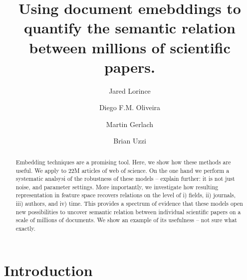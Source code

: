 \documentclass[aps,pre,twocolumn,superscriptaddress]{revtex4-1}
\begin{document}
\title{Using document emebddings to quantify the semantic relation between millions of scientific papers. }



\author{Jared Lorince} 

\author{Diego F.M. Oliveira} 

\author{Martin Gerlach} 

\author{Brian Uzzi}

\begin{abstract}
%
Embedding techniques are a promising tool.
Here, we show how these methods are useful.
We apply to 22M articles of web of science.
On the one hand we perform a systematic analsysi of the robustness of these models -- explain further: it is not just noise, and parameter settings.
More importantly, we investigate how resulting representation in feature space recovers relations on the level of 
i) fields, ii) journals, iii) authors, and iv) time.
This provides a spectrum of evidence that these models open new possibilities to uncover semantic relation between individual scientific papers on a scale of millions of documents.
We show an example of its usefulness -- not sure what exactly.


\end{abstract} 

\maketitle

\section{Introduction}
\label{sec.intro}
\end{document}
